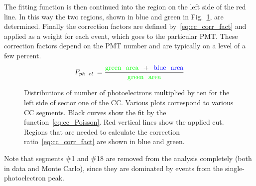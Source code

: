 The fitting function is then continued into the region on the left side of the red line. In this way the two regions, shown in blue and green in Fig.~\ref{fig:nphe_cut}, are determined. Finally the correction factors are defined by~\eqref{eq:cc_corr_fact} and applied as a weight for each event, which goes to the particular PMT. These correction factors depend on the PMT number and are typically on a level of a few percent.
\begin{equation}
F_{ph.\,\, el.} = \frac{\textrm{\color{green}{green\,\,  area} \color{black}{\,\,+\,\,} \color{blue}{blue\,\,  area}}}{\textrm{\color{green}{green\,\,  area}}}
\label{eq:cc_corr_fact}
\end{equation}

\begin{figure}[htp]
\begin{center}
\caption{\small Distributions of number of photoelectrons multiplied by ten for the left side of sector one of the CC. Various plots correspond to various CC segments. Black curves show the fit by the function~\eqref{eq:cc_Poisson}. Red vertical lines show the applied cut. Regions that are needed to calculate the correction ratio~\eqref{eq:cc_corr_fact} are shown in blue and green. } \label{fig:nphe_cut}
\end{center}
\end{figure}


Note that segments \#1 and \#18 are removed from the analysis completely (both in data and Monte Carlo), since they are dominated by events from the single-photoelectron peak. 



